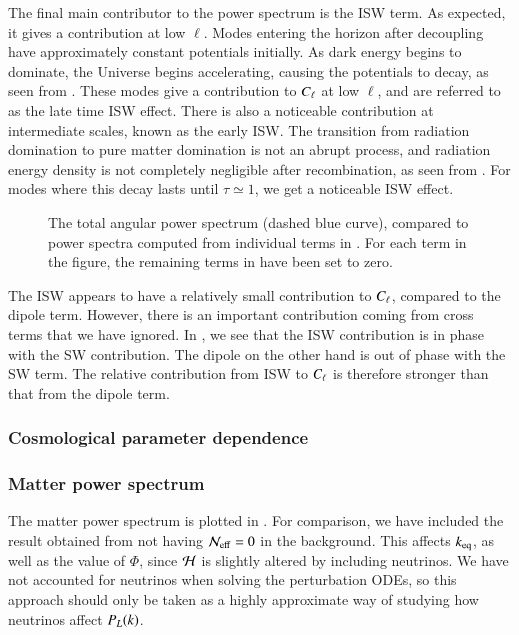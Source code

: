 The final main contributor to the power spectrum is the ISW term. As expected, it gives a contribution at low $\ell$. Modes entering the horizon after decoupling have approximately constant potentials initially. As dark energy begins to dominate, the Universe begins accelerating, causing the potentials to decay, as seen from . These modes give a contribution to $C_\ell$ at low $\ell$, and are referred to as the late time ISW effect. There is also a noticeable contribution at intermediate scales, known as the early ISW. The transition from radiation domination to pure matter domination is not an abrupt process, and radiation energy density is not completely negligible after recombination, as seen from . For modes where this decay lasts until $\tau\simeq1$, we get a noticeable ISW effect.   
\begin{figure}[ht!]
    \caption{The total angular power spectrum (dashed blue curve), compared to power spectra computed from individual terms in . For each term in the figure, the remaining terms in  have been set to zero.}
    \label{fig:M4:results:cells_components}
\end{figure}

The ISW appears to have a relatively small contribution to $C_\ell$, compared to the dipole term. However, there is an important contribution coming from cross terms that we have ignored. In , we see that the ISW contribution is in phase with the SW contribution. The dipole on the other hand is out of phase with the SW term. The relative contribution from ISW to $C_\ell$ is therefore stronger than that from the dipole term.   

\subsubsection{Cosmological parameter dependence}

\subsubsection{Matter power spectrum} \label{sssec:M4:results:matter_power_spectrum}
The matter power spectrum is plotted in . For comparison, we have included the result obtained from not having $\mathcal{N}_\mathrm{eff}=0$ in the background. This affects $k_\mathrm{eq}$, as well as the value of $\Phi$, since $\mathcal{H}$ is slightly altered by including neutrinos. We have not accounted for neutrinos when solving the perturbation ODEs, so this approach should only be taken as a highly approximate way of studying how neutrinos affect $P_L(k)$. 


